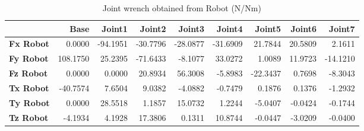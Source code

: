 \begin{table}[h!]
	\centering
	\caption{Joint wrench obtained from Robot (N/Nm)}
	\label{wrech_Robot_Pose8}
	\begin{tabular}{|l|r|r|r|r|r|r|r|r|}
		\hline
		\textbf{} & \textbf{Base} & \textbf{Joint1}  & \textbf{Joint2}  & \textbf{Joint3}  & \textbf{Joint4}  & \textbf{Joint5}  & \textbf{Joint6}  & \textbf{Joint7} \\ \hline
		\textbf{Fx Robot}  & 0.0000        & -94.1951        & -30.7796        & -28.0877        & -31.6909        & 21.7844        & 20.5809        & 2.1611 \\ \hline
		\textbf{Fy Robot}  & 108.1750        & 25.2395        & -71.6433        & -8.1077        & 33.0272        & 1.0089        & 11.9723        & -14.1210 \\ \hline
		\textbf{Fz Robot}  & 0.0000        & 0.0000        & 20.8934        & 56.3008        & -5.8983        & -22.3437        & 0.7698        & -8.3043 \\ \hline
		\textbf{Tx Robot}  & -40.7574        & 7.6504        & 9.0382        & -4.0882        & -0.7479        & 0.1876        & 0.1376        & -1.2932 \\ \hline
		\textbf{Ty Robot}  & 0.0000        & 28.5518        & 1.1857        & 15.0732        & 1.2244        & -5.0407        & -0.0424        & -0.1744 \\ \hline
		\textbf{Tz Robot}  & -4.1934        & 4.1928        & 17.3806        & 0.1311        & 10.8744        & -0.0447        & -3.0209        & -0.0400 \\ \hline
	\end{tabular}
\end{table}

